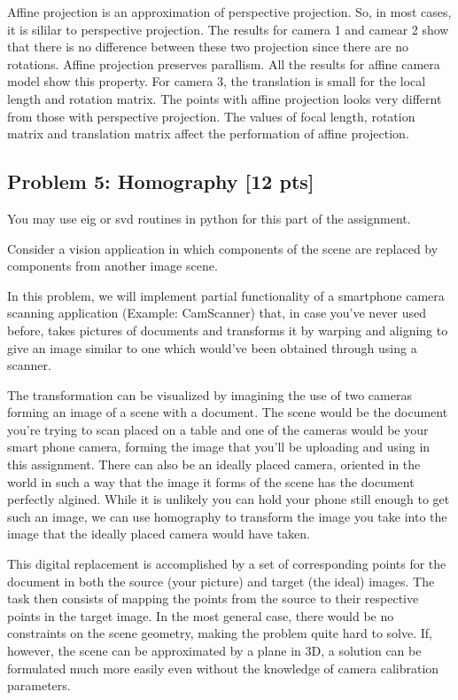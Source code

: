 \documentclass[11pt]{article}
\begin{document}
Affine projection is an approximation of perspective projection. So, in
most cases, it is sililar to perspective projection. The results for
camera 1 and camear 2 show that there is no difference between these two
projection since there are no rotations. Affine projection preserves
parallism. All the results for affine camera model show this property.
For camera 3, the translation is small for the local length and rotation
matrix. The points with affine projection looks very differnt from those
with perspective projection. The values of focal length, rotation matrix
and translation matrix affect the performation of affine projection.

    \subsection{Problem 5: Homography {[}12
pts{]}}\label{problem-5-homography-12-pts}

You may use eig or svd routines in python for this part of the
assignment.

Consider a vision application in which components of the scene are
replaced by components from another image scene.

In this problem, we will implement partial functionality of a smartphone
camera scanning application (Example: CamScanner) that, in case you've
never used before, takes pictures of documents and transforms it by
warping and aligning to give an image similar to one which would've been
obtained through using a scanner.

The transformation can be visualized by imagining the use of two cameras
forming an image of a scene with a document. The scene would be the
document you're trying to scan placed on a table and one of the cameras
would be your smart phone camera, forming the image that you'll be
uploading and using in this assignment. There can also be an ideally
placed camera, oriented in the world in such a way that the image it
forms of the scene has the document perfectly algined. While it is
unlikely you can hold your phone still enough to get such an image, we
can use homography to transform the image you take into the image that
the ideally placed camera would have taken.

This digital replacement is accomplished by a set of corresponding
points for the document in both the source (your picture) and target
(the ideal) images. The task then consists of mapping the points from
the source to their respective points in the target image. In the most
general case, there would be no constraints on the scene geometry,
making the problem quite hard to solve. If, however, the scene can be
approximated by a plane in 3D, a solution can be formulated much more
easily even without the knowledge of camera calibration parameters.
\end{document}
